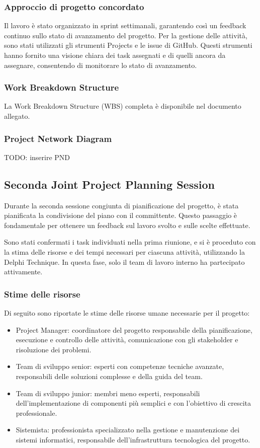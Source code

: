 \subsubsection{Approccio di progetto concordato}
Il lavoro è stato organizzato in sprint settimanali, garantendo così un feedback continuo sullo stato di avanzamento del progetto. Per la gestione delle attività, sono stati utilizzati gli strumenti Projects e le issue di GitHub. Questi strumenti hanno fornito una visione chiara dei task assegnati e di quelli ancora da assegnare, consentendo di monitorare lo stato di avanzamento.

\subsubsection{Work Breakdown Structure}
La Work Breakdown Structure (WBS) completa è disponibile nel documento allegato.

\subsubsection{Project Network Diagram}
TODO: inserire PND

\subsection{Seconda Joint Project Planning Session}
Durante la seconda sessione congiunta di pianificazione del progetto, è stata pianificata la condivisione del piano con il committente. Questo passaggio è fondamentale per ottenere un feedback sul lavoro svolto e sulle scelte effettuate.

Sono stati confermati i task individuati nella prima riunione, e si è proceduto con la stima delle risorse e dei tempi necessari per ciascuna attività, utilizzando la Delphi Technique. In questa fase, solo il team di lavoro interno ha partecipato attivamente.

\subsubsection{Stime delle risorse}
Di seguito sono riportate le stime delle risorse umane necessarie per il progetto:

\begin{itemize}
    \item Project Manager: coordinatore del progetto responsabile della pianificazione, esecuzione e controllo delle attività, comunicazione con gli stakeholder e risoluzione dei problemi.
    \item Team di sviluppo senior: esperti con competenze tecniche avanzate, responsabili delle soluzioni complesse e della guida del team.
    \item Team di sviluppo junior: membri meno esperti, responsabili dell'implementazione di componenti più semplici e con l'obiettivo di crescita professionale.
    \item Sistemista: professionista specializzato nella gestione e manutenzione dei sistemi informatici, responsabile dell'infrastruttura tecnologica del progetto.
\end{itemize}

